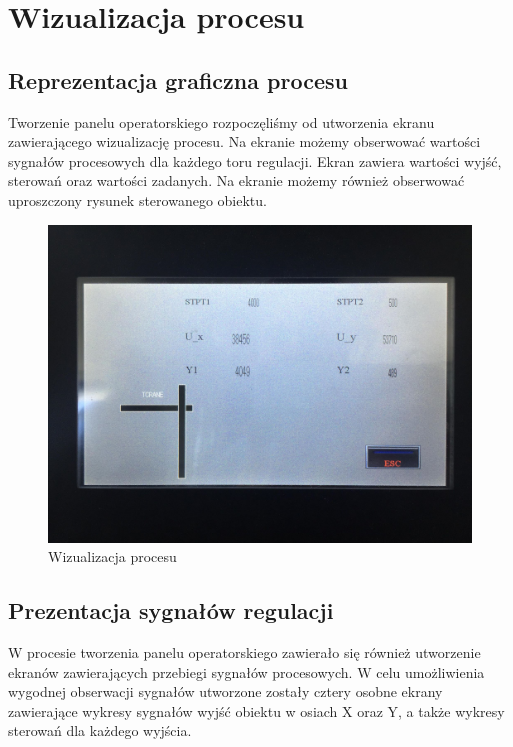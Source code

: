 \chapter{Wizualizacja procesu}
\label{inteco_wizualizacja}

\section{Reprezentacja graficzna procesu}
\label{inteco_wizualizacja_repr}
Tworzenie panelu operatorskiego rozpoczęliśmy od utworzenia ekranu zawierającego wizualizację procesu. Na ekranie możemy obserwować wartości sygnałów procesowych dla każdego toru regulacji. Ekran zawiera wartości wyjść, sterowań oraz wartości zadanych. Na ekranie możemy również obserwować uproszczony rysunek sterowanego obiektu.
\\

\begin{figure}[H]
    \label{TCRANE::Wizualizacja}
    \centering
    \includegraphics[scale=0.15]{./sections/inteco/images/reprezentacja_obiektu.jpg}
    \caption{Wizualizacja procesu}
\end{figure}

\section{Prezentacja sygnałów regulacji}
\label{inteco_wizualizacja_wykresy}
W procesie tworzenia panelu operatorskiego zawierało się również utworzenie ekranów zawierających przebiegi sygnałów procesowych. W celu umożliwienia wygodnej obserwacji sygnałów utworzone zostały cztery osobne ekrany zawierające wykresy sygnałów wyjść obiektu w osiach X oraz Y, a także wykresy sterowań dla każdego wyjścia.

